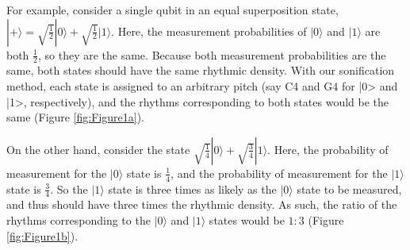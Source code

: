 \documentclass[10pt,twocolumn]{article}
\begin{document}
For example, consider a single qubit in an equal superposition state, $|+\rangle = \sqrt{\frac{1}{2}}|0\rangle + \sqrt{\frac{1}{2}}|1\rangle$. Here, the measurement probabilities of $|0\rangle$ and $|1\rangle$ are both $\frac{1}{2}$, so they are the same. Because both measurement probabilities are the same, both states should have the same rhythmic density. With our sonification method, each state is assigned to an arbitrary pitch (say C4 and G4 for |0> and |1>, respectively), and the rhythms corresponding to both states would be the same (Figure \ref{fig:Figure1a}).

On the other hand, consider the state $\sqrt{\frac{1}{4}}|0\rangle + \sqrt{\frac{3}{4}}|1\rangle$. Here, the probability of measurement for the $|0\rangle$ state is $\frac{1}{4}$, and the probability of measurement for the $|1\rangle$ state is $\frac{3}{4}$. So the $|1\rangle$ state is three times as likely as the $|0\rangle$ state to be measured, and thus should have three times the rhythmic density.  As such, the ratio of the rhythms corresponding to the $|0\rangle$ and $|1\rangle$ states would be $1:3$ (Figure \ref{fig:Figure1b}).
\end{document}
